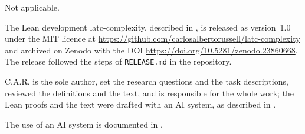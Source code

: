 \documentclass[pdflatex,sn-mathphys-num]{sn-jnl}
\theoremstyle{thmstyleone}
\theoremstyle{thmstylethree}
\begin{document}
Not applicable.

The Lean development latc-complexity, described in , is
released as version~1.0 under the MIT licence at
\url{https://github.com/carlosalbertorussell/latc-complexity} and archived on Zenodo with the
DOI \url{https://doi.org/10.5281/zenodo.23860668}. The release followed the steps of
\texttt{RELEASE.md} in the repository.

C.A.R. is the sole author, set the research questions and the task
descriptions, reviewed the definitions and the text, and is responsible for the whole work;
the Lean proofs and the text were drafted with an AI system, as described in .

The use of an AI system is documented in .
\end{document}
